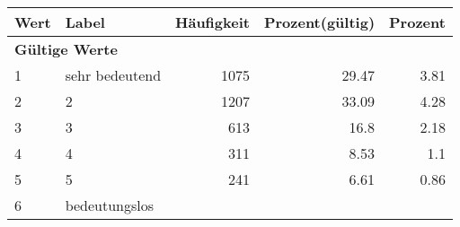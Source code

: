      \begin{longtable}{lXrrr}
     \toprule
     \textbf{Wert} & \textbf{Label} & \textbf{Häufigkeit} & \textbf{Prozent(gültig)} & \textbf{Prozent} \\
     \endhead
     \midrule
     \multicolumn{5}{l}{\textbf{Gültige Werte}}\\

     1 &
     \multicolumn{1}{X}{ sehr bedeutend   } &


       \num{1075} &
       \num[round-mode=places,round-precision=2]{29,47} &
         \num[round-mode=places,round-precision=2]{3,81} \\

     2 &
     \multicolumn{1}{X}{ 2   } &


       \num{1207} &
       \num[round-mode=places,round-precision=2]{33,09} &
         \num[round-mode=places,round-precision=2]{4,28} \\

     3 &
     \multicolumn{1}{X}{ 3   } &


       \num{613} &
       \num[round-mode=places,round-precision=2]{16,8} &
         \num[round-mode=places,round-precision=2]{2,18} \\

     4 &
     \multicolumn{1}{X}{ 4   } &


       \num{311} &
       \num[round-mode=places,round-precision=2]{8,53} &
         \num[round-mode=places,round-precision=2]{1,1} \\

     5 &
     \multicolumn{1}{X}{ 5   } &


       \num{241} &
       \num[round-mode=places,round-precision=2]{6,61} &
         \num[round-mode=places,round-precision=2]{0,86} \\

     6 &
     \multicolumn{1}{X}{ bedeutungslos   } &



\end{longtable}
